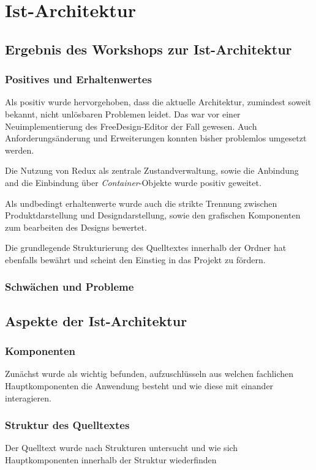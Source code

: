 \section{Ist-Architektur}

\subsection{Ergebnis des Workshops zur Ist-Architektur}

\subsubsection{Positives und Erhaltenwertes}
Als positiv wurde hervorgehoben, dass die aktuelle Architektur, zumindest soweit bekannt, nicht unlösbaren Problemen leidet. 
Das war vor einer Neuimplementierung des FreeDesign-Editor der Fall gewesen. 
Auch Anforderungsänderung und Erweiterungen konnten bisher problemlos umgesetzt werden. 

Die Nutzung von Redux als zentrale Zustandverwaltung, sowie die Anbindung and die Einbindung über \textit{Container}-Objekte wurde positiv geweitet. 

Als undbedingt erhaltenwerte wurde auch die strikte Trennung zwischen Produktdarstellung und Designdarstellung, sowie den grafischen Komponenten zum bearbeiten des Designs bewertet. 

Die grundlegende Strukturierung des Quelltextes innerhalb der Ordner hat ebenfalls bewährt und scheint den Einstieg in das Projekt zu fördern. 

\subsubsection{Schwächen und Probleme}

\subsection{Aspekte der Ist-Architektur}



\subsubsection{Komponenten}
Zunächst wurde als wichtig befunden, aufzuschlüsseln aus welchen fachlichen Hauptkomponenten die Anwendung besteht und wie diese mit einander interagieren.

\subsubsection{Struktur des Quelltextes}
Der Quelltext wurde nach Strukturen untersucht und wie sich Hauptkomponenten innerhalb der Struktur wiederfinden

